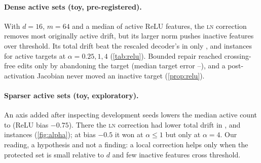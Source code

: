 \documentclass{article}
\theoremstyle{plain}
\theoremstyle{definition}
\theoremstyle{remark}
\newcommand{\LN}{\textsc{ln}}
\begin{document}
\paragraph{Dense active sets (toy, pre-registered).}
With $d=16$, $m=64$ and a median of \DenseReluActMed{} active ReLU features, the \LN{}
correction removes most originally active drift, but its larger norm pushes inactive features
over threshold. Its total drift beat the rescaled decoder's in only \DenseReluActQWins,
\DenseReluActOneWins{} and \DenseReluActFourWins{} instances for active targets at
$\alpha = 0.25, 1, 4$ (\cref{tab:relu}). Bounded repair reached crossing-free edits only by
abandoning the target (median target error \RepairTgtMin--\RepairTgtMax), and a
post-activation Jacobian never moved an inactive target (\cref{prop:relu}).

\paragraph{Sparser active sets (toy, exploratory).}
An axis added after inspecting development seeds lowers the median active count to
\SparseSeventyFiveActMed{} (ReLU bias $-0.75$). There the \LN{} correction had lower total
drift in \SparseSeventyFiveActQWins, \SparseSeventyFiveActOneWins{} and
\SparseSeventyFiveActFourWins{} instances (\cref{fig:alpha}); at bias $-0.5$ it won at
$\alpha\le1$ but only \SparseFiftyActFourWins{} at $\alpha=4$. Our reading, a hypothesis and
not a finding: a local correction helps only when the protected set is small relative to $d$
and few inactive features cross threshold.
\end{document}
